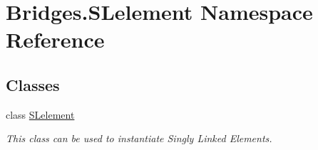 \hypertarget{namespace_bridges_1_1_s_lelement}{}\section{Bridges.\+S\+Lelement Namespace Reference}
\label{namespace_bridges_1_1_s_lelement}
\subsection*{Classes}
\begin{DoxyCompactItemize}
\item 
class \mbox{\hyperlink{class_bridges_1_1_s_lelement_1_1_s_lelement}{S\+Lelement}}
\begin{DoxyCompactList}\small\item\em This class can be used to instantiate Singly Linked Elements. \end{DoxyCompactList}\end{DoxyCompactItemize}
